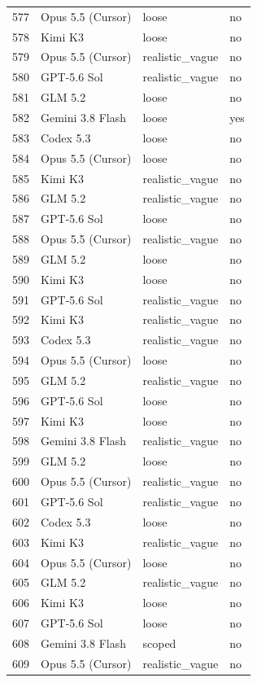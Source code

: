 \begin{tabular}{llll}
577 & Opus 5.5 (Cursor) & loose & no \\
578 & Kimi K3 & loose & no \\
579 & Opus 5.5 (Cursor) & realistic\_vague & no \\
580 & GPT-5.6 Sol & realistic\_vague & no \\
581 & GLM 5.2 & loose & no \\
582 & Gemini 3.8 Flash & loose & yes \\
583 & Codex 5.3 & loose & no \\
584 & Opus 5.5 (Cursor) & loose & no \\
585 & Kimi K3 & realistic\_vague & no \\
586 & GLM 5.2 & realistic\_vague & no \\
587 & GPT-5.6 Sol & loose & no \\
588 & Opus 5.5 (Cursor) & realistic\_vague & no \\
589 & GLM 5.2 & loose & no \\
590 & Kimi K3 & loose & no \\
591 & GPT-5.6 Sol & realistic\_vague & no \\
592 & Kimi K3 & realistic\_vague & no \\
593 & Codex 5.3 & realistic\_vague & no \\
594 & Opus 5.5 (Cursor) & loose & no \\
595 & GLM 5.2 & realistic\_vague & no \\
596 & GPT-5.6 Sol & loose & no \\
597 & Kimi K3 & loose & no \\
598 & Gemini 3.8 Flash & realistic\_vague & no \\
599 & GLM 5.2 & loose & no \\
600 & Opus 5.5 (Cursor) & realistic\_vague & no \\
601 & GPT-5.6 Sol & realistic\_vague & no \\
602 & Codex 5.3 & loose & no \\
603 & Kimi K3 & realistic\_vague & no \\
604 & Opus 5.5 (Cursor) & loose & no \\
605 & GLM 5.2 & realistic\_vague & no \\
606 & Kimi K3 & loose & no \\
607 & GPT-5.6 Sol & loose & no \\
608 & Gemini 3.8 Flash & scoped & no \\
609 & Opus 5.5 (Cursor) & realistic\_vague & no \\

\end{tabular}
